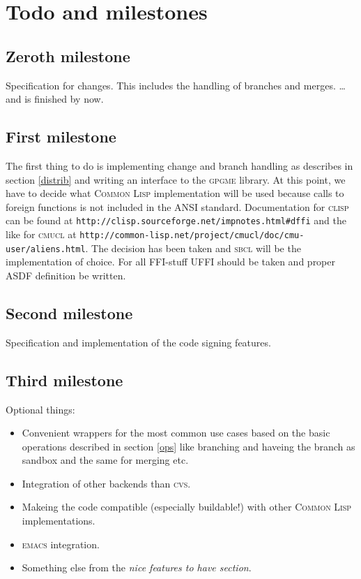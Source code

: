 \documentclass[fleqn, 10pt, a4paper]{report}
\begin{document}
\section{Todo and milestones}

\subsection{Zeroth milestone}
Specification for changes. This includes
the handling of branches and merges.
\ldots and is finished by now.

\subsection{First milestone}
The first thing to do is implementing change and branch handling as describes
in section \ref{distrib} and writing an
interface to the \textsc{gpgme} library. At this point, we have to decide
what \textsc{Common Lisp} implementation will be used because calls
to foreign functions is not included in the ANSI standard.
Documentation for \textsc{clisp} can be found at
\texttt{http://clisp.sourceforge.net/impnotes.html\#dffi} and the like
for \textsc{cmucl} at \texttt{http://common-lisp.net/project/cmucl/doc/cmu-user/aliens.html}.
The decision has been taken and \textsc{sbcl} will be the implementation of
choice. For all FFI-stuff \textsc{UFFI} should be taken and proper
\textsc{ASDF} definition be written.

\subsection{Second milestone}
Specification and implementation of the code signing features.

\subsection{Third milestone}
Optional things:
\begin{itemize}
\item Convenient wrappers for the most common use cases based
on the basic operations described in section \ref{ops} like
branching and haveing the branch as sandbox and the same for merging
etc.
\item Integration of other backends than \textsc{cvs}.
\item Makeing the code compatible (especially buildable!) with
other \textsc{Common Lisp} implementations.
\item \textsc{emacs} integration.
\item Something else from the \emph{nice features to have section}.
\end{itemize}
\end{document}
